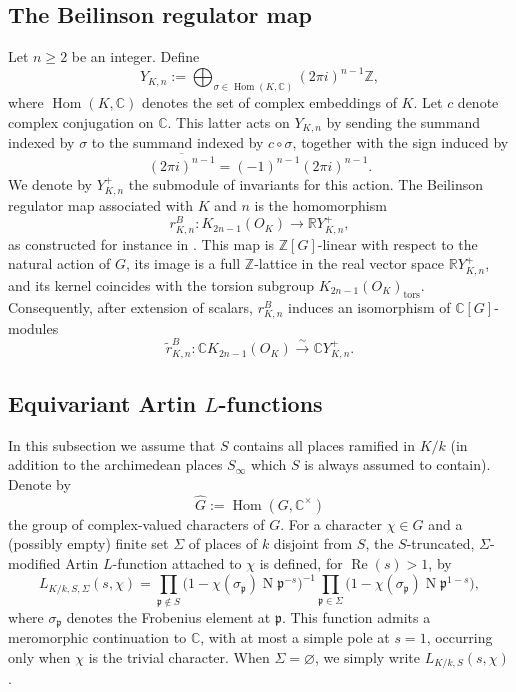 \documentclass[a4paper,11pt]{article}
\begin{document}
\subsection{The Beilinson regulator map}\label{Sec2.2}

Let \(n \geq 2\) be an integer. Define
\[
Y_{K,n}:=
\bigoplus_{\sigma \in \operatorname{Hom}(K,\mathbb C)}
(2\pi i)^{n-1}\mathbb Z,
\]
where \(\operatorname{Hom}(K,\mathbb C)\) denotes the set of complex embeddings
of \(K\). Let \(c\) denote complex conjugation on \(\mathbb C\). This latter acts on \(Y_{K,n}\) by sending the summand indexed by \(\sigma\) to
the summand indexed by \(c\circ \sigma\), together with the sign induced by
\[
\overline{(2\pi i)^{n-1}}=(-1)^{n-1}(2\pi i)^{n-1}.
\]
We denote by \(Y_{K,n}^{+}\) the submodule of invariants for this action.
\noindent The Beilinson regulator map associated with \(K\) and \(n\) is the homomorphism
\[
r^B_{K,n}:K_{2n-1}(O_K)\longrightarrow \mathbb R Y_{K,n}^{+},
\]
as constructed for instance in \cite{Rapoport}. This map is
\(\mathbb Z[G]\)-linear with respect to the natural action of \(G\), its image
is a full \(\mathbb Z\)-lattice in the real vector space
\(\mathbb R Y_{K,n}^{+}\), and its kernel coincides with the torsion subgroup
\(K_{2n-1}(O_K)_{\mathrm{tors}}\).
Consequently, after extension of scalars, \(r^B_{K,n}\) induces an isomorphism
of \(\mathbb C[G]\)-modules
\[
\widetilde r^B_{K,n}:
\mathbb C K_{2n-1}(O_K)
\xrightarrow{\sim}
\mathbb C Y_{K,n}^{+}.
\]
\subsection{Equivariant Artin \texorpdfstring{$L$}{L}-functions}\label{Sec2.3}
In this subsection we assume  that \(S\) contains all places ramified in \(K/k\) (in addition to the archimedean
places \(S_\infty\) which $S$ is always assumed to contain). Denote by
\[
\widehat G:=\operatorname{Hom}(G,\mathbb C^\times)
\]
the group of complex-valued characters of \(G\).
For a character \(\chi\in\widehat G\) and a (possibly empty) finite set \(\Sigma\) of places of \(k\)
disjoint from \(S\), the \(S\)-truncated, \(\Sigma\)-modified Artin \(L\)-function
attached to \(\chi\) is defined, for \(\operatorname{Re}(s)>1\), by
\[
L_{K/k,S,\Sigma}(s,\chi)
=
\prod_{\mathfrak p\notin S}
\bigl(1-\chi(\sigma_{\mathfrak p})\operatorname{N}\mathfrak p^{-s}\bigr)^{-1}
\prod_{\mathfrak p\in \Sigma}
\bigl(1-\chi(\sigma_{\mathfrak p})\operatorname{N}\mathfrak p^{1-s}\bigr),
\]
where \(\sigma_{\mathfrak p}\) denotes the Frobenius element at
\(\mathfrak p\). This function admits a meromorphic continuation to
\(\mathbb C\), with at most a simple pole at \(s=1\), occurring only when
\(\chi\) is the trivial character. When \(\Sigma=\varnothing\), we simply write
\(L_{K/k,S}(s,\chi)\).
\end{document}
